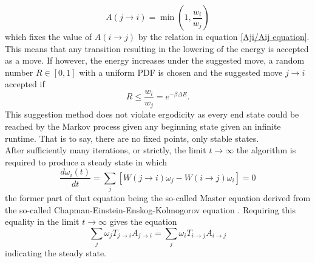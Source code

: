 \documentclass[10pt,a4paper]{article}
\begin{document}
\begin{equation}
A(j \rightarrow i) = \min \left( 1, \frac{w_i}{w_j} \right)
\end{equation}
which fixes the value of $A(i \rightarrow j)$ by the relation in equation \eqref{Aji/Aij equation}. This means that any transition resulting in the lowering of the energy is accepted as a move. If however, the energy increases under the suggested move, a random number $R \in [0,1]$ with a uniform PDF is chosen and the suggested move $j\rightarrow i$ accepted if
\begin{equation}
R \leq \frac{w_i}{w_j} =e^{-\beta \Delta E}.
\end{equation}
This suggestion method does not violate ergodicity as every end state could be reached by the Markov process given any beginning state given an infinite runtime. That is to say, there are no fixed points, only stable states.\\After sufficiently many iterations, or strictly, the limit $t\rightarrow \infty$ the algorithm is required to produce a steady state in which
\begin{equation}
\dfrac{d\omega_i(t)}{dt} = \sum_j \left[ W(j\rightarrow i)\omega_j - W(i\rightarrow j)\omega_i \right] = 0
\end{equation}
the former part of that equation being the so-called Master equation derived from the so-called Chapman-Einstein-Enskog-Kolmogorov equation \cite{Lecture_Notes_Fall_2015}. Requiring this equality in the limit $t\rightarrow \infty$ gives the equation
\begin{equation}
\sum_j \omega_jT_{j\rightarrow i}A_{j\rightarrow i} = \sum_j \omega_iT_{i\rightarrow j}A_{i\rightarrow j}
\end{equation}
indicating the steady state.
\end{document}
